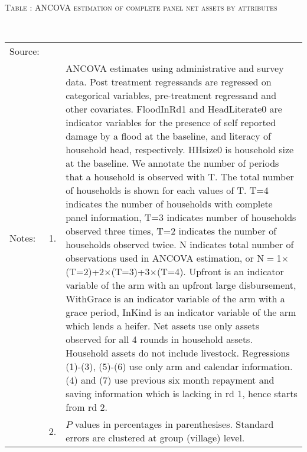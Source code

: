 \hspace{-1cm}\begin{minipage}[t]{14cm}
\hfil\textsc{\normalsize Table \thetable: ANCOVA estimation of complete panel net assets by attributes\label{tab ANCOVA narrow complete panel net assets attributes}}\\
\setlength{\tabcolsep}{1pt}
\setlength{\baselineskip}{8pt}
\renewcommand{\arraystretch}{.55}
\hfil{}\\
\renewcommand{\arraystretch}{.8}
\setlength{\tabcolsep}{1pt}
\begin{tabular}{>{\hfill\scriptsize}p{1cm}<{}>{\hfill\scriptsize}p{.25cm}<{}>{\scriptsize}p{12cm}<{\hfill}}
Source:& \multicolumn{2}{l}{\scriptsize Estimated with GUK administrative and survey data.}\\
Notes: & 1. & ANCOVA estimates using administrative and survey data. Post treatment regressands are regressed on categorical variables, pre-treatment regressand and other covariates. \textsf{FloodInRd1} and \textsf{HeadLiterate0} are indicator variables for the presence of self reported damage by a flood at the baseline, and literacy of household head, respectively. \textsf{HHsize0} is household size at the baseline. We annotate the number of periods that a household is observed with \textsf{T}. The total number of households is shown for each values of \textsf{T}. \textsf{T=4} indicates the number of households with complete panel information, \textsf{T=3} indicates number of households observed three times, \textsf{T=2} indicates the number of households observed twice. \textsf{N} indicates total number of observations used in ANCOVA estimation, or \textsf{N$=$1$\times$(T=2)+2$\times$(T=3)+3$\times$(T=4)}.  \textsf{Upfront} is an indicator variable of the arm with an upfront large disbursement, \textsf{WithGrace} is an indicator variable of the arm with a grace period, \textsf{InKind} is an indicator variable of the arm which lends a heifer. Net assets use only assets observed for all 4 rounds in household assets. Household assets do not include livestock. Regressions (1)-(3), (5)-(6) use only arm and calendar information. (4) and (7) use previous six month repayment and saving information which is lacking in rd 1, hence starts from rd 2.\\
& 2. & $P$ values in percentages in parenthesises. Standard errors are clustered at group (village) level.
\end{tabular}
\end{minipage}

